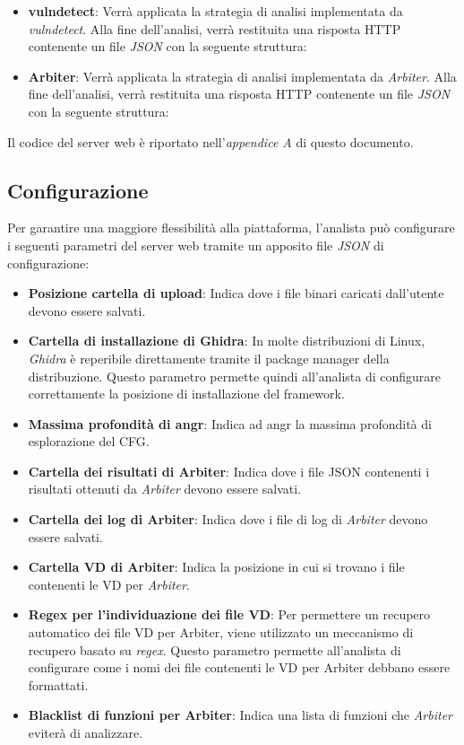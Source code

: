\documentclass[../main.tex]{subfiles}
\begin{document}
\begin{itemize}
    \begin{itemize}
        \item \textbf{vulndetect}: Verrà applicata la strategia di analisi implementata da \textit{vulndetect}. Alla fine dell'analisi, verrà restituita una risposta
        HTTP contenente un file \textit{JSON} con la seguente struttura:
        \noindent
        
        \item \textbf{Arbiter}: Verrà applicata la strategia di analisi implementata da \textit{Arbiter}. Alla fine dell'analisi, verrà restituita una risposta
        HTTP contenente un file \textit{JSON} con la seguente struttura:
        
    \end{itemize}
\end{itemize}
Il codice del server web è riportato nell'\textit{appendice A} di questo documento.
\subsection{Configurazione}
Per garantire una maggiore flessibilità alla piattaforma, l'analista può configurare i seguenti parametri
del server web tramite un apposito file \textit{JSON} di configurazione:
\begin{itemize}
    \item \textbf{Posizione cartella di upload}: Indica dove i file binari caricati dall'utente devono essere salvati.
    \item \textbf{Cartella di installazione di Ghidra}: In molte distribuzioni di Linux, \textit{Ghidra} è reperibile direttamente tramite il package manager della distribuzione.
    Questo parametro permette quindi all'analista di configurare correttamente la posizione di installazione del framework.
    \item \textbf{Massima profondità di angr}: Indica ad angr la massima profondità di esplorazione del CFG.
    \item \textbf{Cartella dei risultati di Arbiter}: Indica dove i file JSON contenenti i risultati ottenuti da \textit{Arbiter} devono essere salvati.
    \item \textbf{Cartella dei log di Arbiter}: Indica dove i file di log di \textit{Arbiter} devono essere salvati.
    \item \textbf{Cartella VD di Arbiter}: Indica la posizione in cui si trovano i file contenenti le VD per \textit{Arbiter}.
    \item \textbf{Regex per l'individuazione dei file VD}: Per permettere un recupero automatico dei file VD per Arbiter, viene utilizzato un meccanismo di recupero basato su \textit{regex}.
    Questo parametro permette all'analista di configurare come i nomi dei file contenenti le VD per Arbiter debbano essere formattati.
    \item \textbf{Blacklist di funzioni per Arbiter}: Indica una lista di funzioni che \textit{Arbiter} eviterà di analizzare.
\end{itemize}
\end{document}
